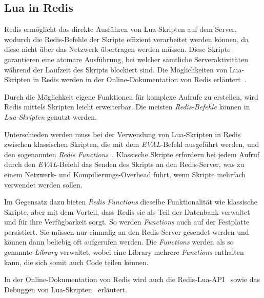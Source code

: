 \subsection{Lua in Redis}
Redis ermöglicht das direkte Ausführen von Lua-Skripten auf dem Server, wodurch die Redis-Befehle der Skripte effizient verarbeitet werden können, da diese nicht über das Netzwerk übertragen werden müssen. Diese Skripte garantieren eine atomare Ausführung, bei welcher sämtliche Serveraktivitäten während der Laufzeit des Skripts blockiert sind. Die Möglichkeiten von Lua-Skripten in Redis werden in der Online-Dokumentation von Redis erläutert~\cite{redis_ltd_scripting_nodate}.

Durch die Möglichkeit eigene Funktionen für komplexe Aufrufe zu erstellen, wird Redis mittels Skripten leicht erweiterbar. Die meisten \emph{Redis-Befehle} können in \emph{Lua-Skripten} genutzt werden.

Unterschieden werden muss bei der Verwendung von Lua-Skripten in Redis zwischen klassischen Skripten, die mit dem \emph{EVAL}-Befehl ausgeführt werden, und den sogenannten \emph{Redis Functions}~\cite{redis_ltd_redis_nodate-1}. Klassische Skripte erfordern bei jedem Aufruf durch den \emph{EVAL}-Befehl das Senden des Skripts an den Redis-Server, was zu einem Netzwerk- und Kompilierungs-Overhead führt, wenn Skripte mehrfach verwendet werden sollen.

Im Gegensatz dazu bieten \emph{Redis Functions} dieselbe Funktionalität wie klassische Skripte, aber mit dem Vorteil, dass Redis sie als Teil der Datenbank verwaltet und für ihre Verfügbarkeit sorgt.  So werden \emph{Functions} auch auf der Festplatte persistiert. Sie müssen nur einmalig an den Redis-Server gesendet werden und können dann beliebig oft aufgerufen werden. Die \emph{Functions} werden als so genannte \emph{Library} verwaltet, wobei eine Library mehrere \emph{Functions} enthalten kann, die sich somit auch Code teilen können.

In der Online-Dokumentation von Redis wird auch die Redis-Lua-API~\cite{redis_ltd_redis_nodate} sowie das Debuggen von Lua-Skripten~\cite{redis_ltd_debugging_nodate} erläutert.

